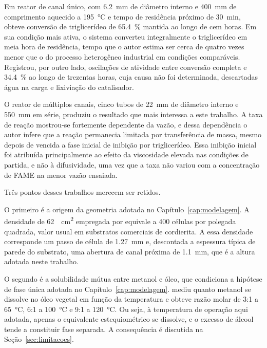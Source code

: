 Em reator de canal único, com \SI{6.2}{\milli\meter} de diâmetro interno e
\SI{400}{\milli\meter} de comprimento aquecido a \SI{195}{\celsius} e tempo de
residência próximo de \SI{30}{\minute}, obteve conversão de triglicerídeo de
\SI{65.4}{\percent} mantida ao longo de cem horas. Em sua condição mais ativa,
o sistema converteu integralmente o triglicerídeo em meia hora de residência,
tempo que o autor estima ser cerca de quatro vezes menor que o do processo
heterogêneo industrial em condições comparáveis. Registrou, por outro lado,
oscilações de atividade entre conversão completa e \SI{34.4}{\percent} ao longo
de trezentas horas, cuja causa não foi determinada, descartadas água na carga e
lixiviação do catalisador.

O reator de múltiplos canais, cinco tubos de \SI{22}{\milli\meter} de diâmetro
interno e \SI{550}{\milli\meter} em série, produziu o resultado que mais
interessa a este trabalho. A taxa de reação mostrou-se fortemente dependente da
vazão, e dessa dependência o autor infere que a reação permanecia limitada por
transferência de massa, mesmo depois de vencida a fase inicial de inibição por
triglicerídeo. Essa inibição inicial foi atribuída principalmente ao efeito da
viscosidade elevada nas condições de partida, e não à difusividade, uma vez que
a taxa não variou com a concentração de FAME na menor vazão ensaiada.

Três pontos desses trabalhos merecem ser retidos.

O primeiro é a origem da geometria adotada no Capítulo~\ref{cap:modelagem}. A
densidade de \SI{62}{\per\centi\meter\squared} empregada por
\textcite{Asli2011} equivale a \num{400} células por polegada quadrada, valor
usual em substratos comerciais de cordierita. A essa densidade corresponde um
passo de célula de \SI{1.27}{\milli\meter} e, descontada a espessura típica de
parede do substrato, uma abertura de canal próxima de \SI{1.1}{\milli\meter},
que é a altura adotada neste trabalho.

O segundo é a solubilidade mútua entre metanol e óleo, que condiciona a
hipótese de fase única adotada no Capítulo~\ref{cap:modelagem}.
\textcite{Firth2014} mediu quanto metanol se dissolve no óleo vegetal em função
da temperatura e obteve razão molar de \num{3}:\num{1} a \SI{65}{\celsius},
\num{6}:\num{1} a \SI{100}{\celsius} e \num{9}:\num{1} a \SI{120}{\celsius}.
Ou seja, à temperatura de operação aqui adotada, apenas o equivalente
estequiométrico se dissolve, e o excesso de álcool tende a constituir fase
separada. A consequência é discutida na Seção~\ref{sec:limitacoes}.

